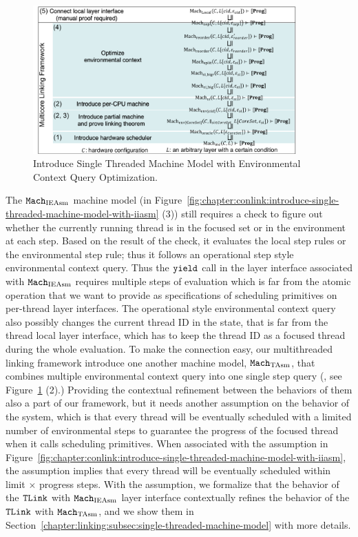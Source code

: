 \begin{figure}
\begin{center}
\includegraphics[width=0.9\textwidth, page=8]{figs/conlink/concurrent_linking}
\end{center}
\caption{Introduce Single Threaded Machine Model with Environmental Context Query Optimization.}
\label{fig:chapter:conlink:introduce-single-threaded-machine-model-with-tasm}
\end{figure}

The ${\mathrm{\texttt{Mach}}}_{\mathrm{IEAsm}}$ machine model  (in Figure~\ref{fig:chapter:conlink:introduce-single-threaded-machine-model-with-iiasm}  (3)) still requires a check to figure out whether the currently running thread is in the focused set or in the environment at each step.
Based on the result of the check, it evaluates the local step rules or the environmental step rule; thus it follows an operational step style environmental context query.
Thus the ${\mathrm{\texttt{yield}}}$ call in the layer interface associated with ${\mathrm{\texttt{Mach}}}_{\mathrm{IEAsm}}$ requires multiple steps of evaluation which is 
far from the atomic operation that we want to provide as specifications of scheduling primitives on per-thread layer interfaces.
The operational style environmental context query also possibly changes 
the current thread ID in the state, that is far from the thread local layer interface, which has to keep the thread ID as a focused thread during the whole evaluation.
To make the connection easy,
our multithreaded linking framework introduce one another machine model, ${\mathrm{\texttt{Mach}}}_{\mathrm{TAsm}}$, 
that combines multiple environmental context query into one single step query (\ie, see Figure~\ref{fig:chapter:conlink:introduce-single-threaded-machine-model-with-tasm} (2).)
Providing the contextual refinement between the behaviors of them also a part of
our framework, but it needs 
another assumption on the behavior of the system,
which is that every thread will be eventually scheduled with a limited number of 
environmental steps to guarantee the progress of the focused thread when it calls scheduling primitives. 
When associated with the assumption in Figure~\ref{fig:chapter:conlink:introduce-single-threaded-machine-model-with-iiasm},
the assumption implies that every thread will be eventually scheduled within limit $\times$ progress steps.
With the assumption, 
we formalize 
that the behavior of  the ${{\mathrm{\texttt{TLink}}}}$ with ${\mathrm{\texttt{Mach}}}_{\mathrm{IEAsm}}$ layer interface  contextually refines
the behavior of  the ${{\mathrm{\texttt{TLink}}}}$ with ${\mathrm{\texttt{Mach}}}_{\mathrm{TAsm}}$, and 
we show them in Section~\ref{chapter:linking:subsec:single-threaded-machine-model} with more details.


